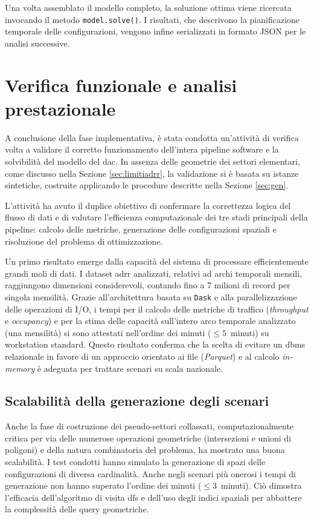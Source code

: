 Una volta assemblato il modello completo, la soluzione ottima viene ricercata invocando il metodo \texttt{model.solve()}. I risultati, che descrivono la pianificazione temporale delle configurazioni, vengono infine serializzati in formato JSON per le analisi successive.

\section{Verifica funzionale e analisi prestazionale}
A conclusione della fase implementativa, è stata condotta un'attività di verifica volta a validare il corretto funzionamento dell'intera pipeline software e la solvibilità del modello del \gls{dac}.
In assenza delle geometrie dei settori elementari, come discusso nella Sezione \ref{sec:limitiadrr}, la validazione si è basata su istanze sintetiche, costruite applicando le procedure descritte nella Sezione \ref{sec:gen}.

L'attività ha avuto il duplice obiettivo di confermare la correttezza logica del flusso di dati e di valutare l'efficienza computazionale dei tre stadi principali della pipeline: calcolo delle metriche, generazione delle configurazioni spaziali e risoluzione del problema di ottimizzazione.

Un primo risultato emerge dalla capacità del sistema di processare efficientemente grandi moli di dati. I dataset \gls{adrr} analizzati, relativi ad archi temporali mensili, raggiungono dimensioni considerevoli, contando fino a 7 milioni di record per singola mensilità. 
Grazie all'architettura basata su \texttt{Dask} e alla parallelizzazione delle operazioni di I/O, i tempi per il calcolo delle metriche di traffico (\emph{throughput} e \emph{occupancy}) e per la stima delle capacità sull'intero arco temporale analizzato (una mensilità) si sono attestati nell'ordine dei minuti ($\le 5$~minuti) su workstation standard. Questo risultato conferma che la scelta di evitare un \gls{dbms} relazionale in favore di un approccio orientato ai file (\emph{Parquet}) e al calcolo \emph{in-memory} è adeguata per trattare scenari su scala nazionale.

\subsection{Scalabilità della generazione degli scenari}
Anche la fase di costruzione dei pseudo-settori collassati, computazionalmente critica per via delle numerose operazioni geometriche (intersezioni e unioni di poligoni) e della natura combinatoria del problema, ha mostrato una buona scalabilità.
I test condotti hanno simulato la generazione di spazi delle configurazioni di diversa cardinalità. Anche negli scenari più onerosi i tempi di generazione non hanno superato l'ordine dei minuti ($\le 3$~minuti). Ciò dimostra l'efficacia dell'algoritmo di visita \gls{dfs} e dell'uso degli indici spaziali per abbattere la complessità delle query geometriche.

